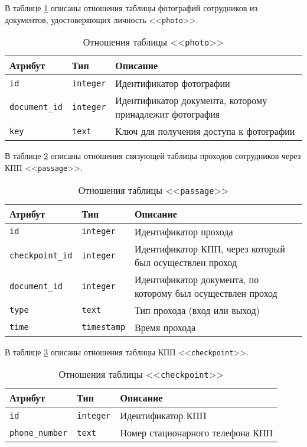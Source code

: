 В таблице \ref{table:photoCols} описаны отношения таблицы фотографий сотрудников из документов, удостоверяющих личность <<\texttt{photo}>>.
\begin{table}[h!]
	\begin{center}
		\caption{\label{table:photoCols} Отношения таблицы <<\texttt{photo}>>}
		\begin{tabularx}{\textwidth}{|X|X|X|}
			\hline
			Атрибут & Тип & Описание \\ \hline
			\texttt{id} & \texttt{integer} & Идентификатор фотографии \\ \hline
			\texttt{document\_id} & \texttt{integer} & Идентификатор документа, которому принадлежит фотография \\ \hline
			\texttt{key} & \texttt{text} & Ключ для получения доступа к фотографии \\ \hline
		\end{tabularx}
	\end{center}
\end{table}

В таблице \ref{table:passageCols} описаны отношения связующей таблицы проходов сотрудников через КПП <<\texttt{passage}>>.
\begin{table}[h!]
	\begin{center}
		\caption{\label{table:passageCols} Отношения таблицы <<\texttt{passage}>>}
		\begin{tabularx}{\textwidth}{|X|X|X|}
			\hline
			Атрибут & Тип & Описание \\ \hline
			\texttt{id} & \texttt{integer} & Идентификатор прохода \\ \hline
			\texttt{checkpoint\_id} & \texttt{integer} & Идентификатор КПП, через который был осуществлен проход \\ \hline
			\texttt{document\_id} & \texttt{integer} & Идентификатор документа, по которому был осуществлен проход \\ \hline
			\texttt{type} & \texttt{text} & Тип прохода (вход или выход) \\ \hline
			\texttt{time} & \texttt{timestamp} & Время прохода \\ \hline
		\end{tabularx}
	\end{center}
\end{table}

\clearpage

В таблице \ref{table:checkpointCols} описаны отношения таблицы КПП <<\texttt{checkpoint}>>.
\begin{table}[h!]
	\begin{center}
		\caption{\label{table:checkpointCols} Отношения таблицы <<\texttt{checkpoint}>>}
		\begin{tabularx}{\textwidth}{|X|X|X|}
			\hline
			Атрибут & Тип & Описание \\ \hline
			\texttt{id} & \texttt{integer} & Идентификатор КПП \\ \hline
			\texttt{phone\_number} & \texttt{text} & Номер стационарного телефона КПП \\ \hline
		\end{tabularx}
	\end{center}
\end{table}

